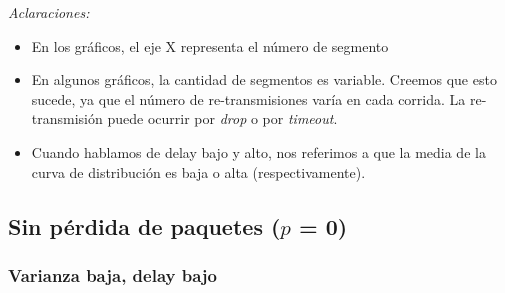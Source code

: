 \emph{Aclaraciones:}
\begin{itemize}
 \item En los gráficos, el eje X representa el número de segmento
 \item En algunos gráficos, la cantidad de segmentos es variable. Creemos que esto sucede, ya que el número de re-transmisiones varía en cada corrida. La re-transmisión puede ocurrir por \emph{drop} o por \emph{timeout}.
 \item Cuando hablamos de delay bajo y alto, nos referimos a que la media de la curva de distribución es baja o alta (respectivamente).
\end{itemize}


\subsection{Sin pérdida de paquetes ($p$ = 0)}

\subsubsection{Varianza baja, delay bajo}

